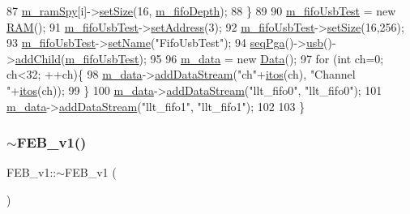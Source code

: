\begin{DoxyCode}
87     \hyperlink{classFEB__v1_ae6d8176c12bd60ad25ed81d535eb8c82}{m\_ramSpy}[i]->\hyperlink{classRAM_adcf2ebb12f1a3e833ce7d5a33670c29d}{setSize}(16, \hyperlink{classFEB__v1_a30473bcdd8f018ad5dac728f6779df9c}{m\_fifoDepth});
88   \}
89 
90   \hyperlink{classFEB__v1_a5850ce498462009212ad3f313fcf0bd6}{m\_fifoUsbTest} = \textcolor{keyword}{new} \hyperlink{classRAM}{RAM}();
91   \hyperlink{classFEB__v1_a5850ce498462009212ad3f313fcf0bd6}{m\_fifoUsbTest}->\hyperlink{classIOobject_ae0d372aaeafe3da3c239677118deb2ac}{setAddress}(3);
92   \hyperlink{classFEB__v1_a5850ce498462009212ad3f313fcf0bd6}{m\_fifoUsbTest}->\hyperlink{classRAM_adcf2ebb12f1a3e833ce7d5a33670c29d}{setSize}(16,256);
93   \hyperlink{classFEB__v1_a5850ce498462009212ad3f313fcf0bd6}{m\_fifoUsbTest}->\hyperlink{classObject_ae30fea75683c2d149b6b6d17c09ecd0c}{setName}(\textcolor{stringliteral}{"FifoUsbTest"});
94   \hyperlink{classFEB__v1_a8bf655504f9b0c51d5aa5bc6b30da00d}{seqPga}()->\hyperlink{classSeqPGA_a10c68ea9de38eb0445d47e4b21b580a1}{usb}()->\hyperlink{classHierarchy_ad677774ff38fcb257c04a3a10d471fac}{addChild}(\hyperlink{classFEB__v1_a5850ce498462009212ad3f313fcf0bd6}{m\_fifoUsbTest});
95 
96   \hyperlink{classFEB__v1_a1c9dbc3660021dba1f58666d0097abb0}{m\_data} = \textcolor{keyword}{new} \hyperlink{classData}{Data}();
97   \textcolor{keywordflow}{for} (\textcolor{keywordtype}{int} ch=0; ch<32; ++ch)\{
98     \hyperlink{classFEB__v1_a1c9dbc3660021dba1f58666d0097abb0}{m\_data}->\hyperlink{classData_a33c31859f6b2771ebd4f0b83fa44739c}{addDataStream}(\textcolor{stringliteral}{"ch"}+\hyperlink{Tools_8h_af330027dbdafb9a30768b3613c553e60}{itos}(ch), \textcolor{stringliteral}{"Channel "}+\hyperlink{Tools_8h_af330027dbdafb9a30768b3613c553e60}{itos}(ch));
99   \}
100   \hyperlink{classFEB__v1_a1c9dbc3660021dba1f58666d0097abb0}{m\_data}->\hyperlink{classData_a33c31859f6b2771ebd4f0b83fa44739c}{addDataStream}(\textcolor{stringliteral}{"llt\_fifo0"}, \textcolor{stringliteral}{"llt\_fifo0"});
101   \hyperlink{classFEB__v1_a1c9dbc3660021dba1f58666d0097abb0}{m\_data}->\hyperlink{classData_a33c31859f6b2771ebd4f0b83fa44739c}{addDataStream}(\textcolor{stringliteral}{"llt\_fifo1"}, \textcolor{stringliteral}{"llt\_fifo1"});
102   
103 \}
\end{DoxyCode}
\mbox{\label{classFEB__v1_a655c6fb31068c4dbb7fde34de77a5a49}} 
\subsubsection{\texorpdfstring{$\sim$\+F\+E\+B\+\_\+v1()}{~FEB\_v1()}}
{\footnotesize\ttfamily F\+E\+B\+\_\+v1\+::$\sim$\+F\+E\+B\+\_\+v1 (\begin{DoxyParamCaption}{ }\end{DoxyParamCaption})\hspace{0.3cm}{\ttfamily [virtual]}}



